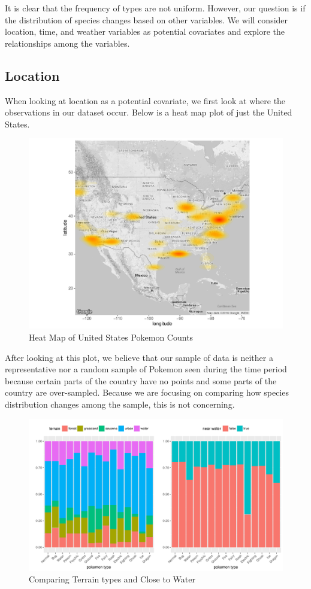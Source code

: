 \documentclass{article}
\begin{document}
\noindent It is clear that the frequency of types are not uniform. However, our question is if the distribution of species changes based on other variables. We will consider location, time, and weather variables as potential covariates and explore the relationships among the variables.

\subsection{Location}
When looking at location as a potential covariate, we first look at where the observations in our dataset occur. Below is a heat map plot of just the United States.

\begin{figure}[H]
\centering
\includegraphics[scale = 0.45]{heatmap.pdf}
\caption{Heat Map of United States Pokemon Counts}
\end{figure}

\noindent After looking at this plot, we believe that our sample of data is neither a representative nor a random sample of Pokemon seen during the time period because certain parts of the country have no points and some parts of the country are over-sampled. Because we are focusing on comparing how species distribution changes among the sample, this is not concerning.

\begin{figure}[H]
\centering
\includegraphics[scale = 0.6]{side_by_side_plot.pdf}
\caption{Comparing Terrain types and Close to Water}
\end{figure}
\end{document}
